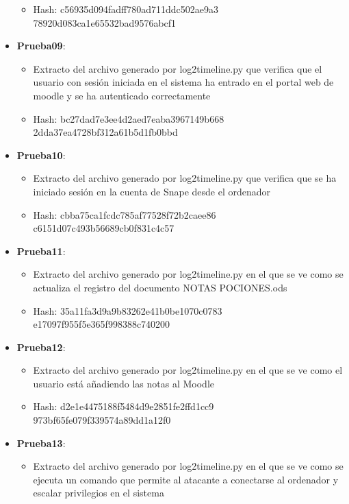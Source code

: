 \begin{itemize}
{\begin{itemize}
      \item{Hash}: c56935d094fadff780ad711ddc502ae9a3\\78920d083ca1e65532bad9576abcf1
    \end{itemize}}
  \item{\textbf{Prueba09}: 
    \begin{itemize}
      \item{Extracto del archivo generado por log2timeline.py que verifica que el usuario con sesión iniciada en el sistema ha entrado en el portal web de moodle y se ha autenticado correctamente}
      \item{Hash}: bc27dad7e3ee4d2aed7eaba3967149b668\\2dda37ea4728bf312a61b5d1fb0bbd
    \end{itemize}}
  \item{\textbf{Prueba10}: 
    \begin{itemize}
      \item{Extracto del archivo generado por log2timeline.py que verifica que se ha iniciado sesión en la cuenta de Snape desde el ordenador}
      \item{Hash}: cbba75ca1fcdc785af77528f72b2caee86\\c6151d07c493b56689cb0f831c4c57
    \end{itemize}}
  \item{\textbf{Prueba11}: 
    \begin{itemize}
      \item{Extracto del archivo generado por log2timeline.py en el que se ve como se actualiza el registro del documento NOTAS POCIONES.ods}
      \item{Hash}: 35a11fa3d9a9b83262e41b0be1070c0783\\e17097f955f5e365f998388c740200
    \end{itemize}}
  \item{\textbf{Prueba12}: 
    \begin{itemize}
      \item{Extracto del archivo generado por log2timeline.py en el que se ve como el usuario está añadiendo las notas al Moodle}
      \item{Hash}: d2e1e4475188f5484d9e2851fe2ffd1cc9\\973bf65fe079f339574a89dd1a12f0
    \end{itemize}}
  \item{\textbf{Prueba13}: 
    \begin{itemize}
      \item{Extracto del archivo generado por log2timeline.py en el que se ve como se ejecuta un comando que permite al atacante a conectarse al ordenador y escalar privilegios en el sistema}

\end{itemize}}
\end{itemize}
